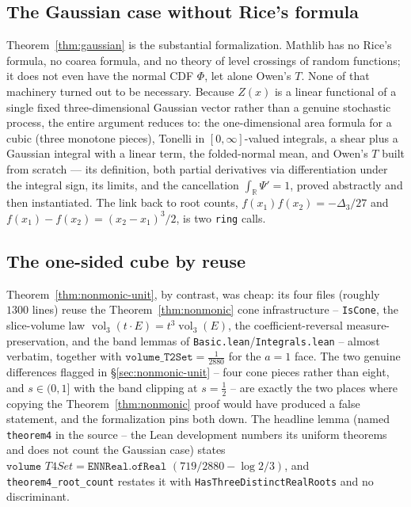 \documentclass[11pt,reqno]{amsart}
\theoremstyle{plain}
\theoremstyle{remark}
\DeclareMathOperator{\vol}{vol}
\newcommand{\RR}{\mathbb{R}}
\newcommand{\disc}{\Delta}
\begin{document}
\subsection*{The Gaussian case without Rice's formula}
Theorem~\ref{thm:gaussian} is the substantial formalization. Mathlib has no
Rice's formula, no coarea formula, and no theory of level crossings of random
functions; it does not even have the normal CDF $\Phi$, let alone Owen's $T$.
None of that machinery turned out to be necessary. Because $Z(x)$ is a linear
functional of a single fixed three-dimensional Gaussian vector rather than a
genuine stochastic process, the entire argument reduces to: the
one-dimensional area formula for a cubic (three monotone pieces), Tonelli in
$[0,\infty]$-valued integrals, a shear plus a Gaussian integral with a linear
term, the folded-normal mean, and Owen's $T$ built from scratch --- its
definition, both partial derivatives via differentiation under the integral
sign, its limits, and the cancellation $\int_\RR\Psi'=1$, proved abstractly
and then instantiated. The link back to root counts,
$f(x_1)f(x_2)=-\disc_3/27$ and $f(x_1)-f(x_2)=(x_2-x_1)^3/2$, is two
\texttt{ring} calls.

\subsection*{The one-sided cube by reuse}
Theorem~\ref{thm:nonmonic-unit}, by contrast, was cheap: its four files
(roughly $1300$ lines) reuse the Theorem~\ref{thm:nonmonic} cone
infrastructure -- \texttt{IsCone}, the slice-volume law $\vol_3(t\cdot E)=t^3\vol_3(E)$,
the coefficient-reversal measure-preservation, and the band lemmas of
\texttt{Basic.lean}/\texttt{Integrals.lean} -- almost verbatim, together with
$\texttt{volume\_T2Set}=\tfrac{1}{2880}$ for the $a=1$ face. The two genuine
differences flagged in \S\ref{sec:nonmonic-unit} -- four cone pieces rather
than eight, and $s\in(0,1]$ with the band clipping at $s=\tfrac12$ -- are
exactly the two places where copying the Theorem~\ref{thm:nonmonic} proof
would have produced a false statement, and the formalization pins both down.
The headline lemma (named \texttt{theorem4} in the source -- the Lean
development numbers its uniform theorems and does not count the Gaussian
case) states
$\texttt{volume }T4Set=\texttt{ENNReal.ofReal }(719/2880-\log 2/3)$, and
\texttt{theorem4\_root\_count} restates it with
\texttt{HasThreeDistinctRealRoots} and no discriminant.
\end{document}
